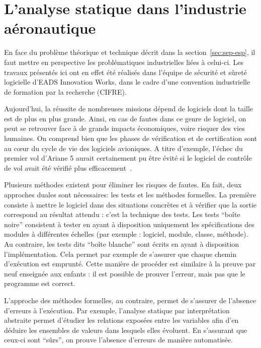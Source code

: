 \section{L'analyse statique dans l'industrie aéronautique}

En face du problème théorique et technique décrit dans la
section~\ref{sec:sep-esp}, il faut mettre en perspective les problématiques
industrielles liées à celui-ci. Les travaux présentés ici ont en effet été
réalisés dans l'équipe de sécurité et sûreté logicielle d'EADS Innovation Works,
dans le cadre d'une convention industrielle de formation par la recherche
(CIFRE).

Aujourd'hui, la réussite de nombreuses missions dépend de logiciels dont la
taille est de plus en plus grande. Ainsi, en cas de fautes dans ce genre de
logiciel, on peut se retrouver face à de grands impacts économiques, voire
risquer des vies humaines. On comprend bien que les phases de vérification et de
certification sont au cœur du cycle de vie des logiciels avioniques. A titre
d'exemple, l'échec du premier vol d'Ariane 5 aurait certainement pu être évité
si le logiciel de contrôle de vol avait été vérifié plus
efficacement~\cite{Ariane501}.

Plusieurs méthodes existent pour éliminer les risques de fautes. En fait, deux
approches duales sont nécessaires: les tests et les méthodes formelles. La
première consiste à mettre le logiciel dans des situations concrètes et à
vérifier que la sortie correspond au résultat attendu : c'est la technique des
tests.  Les tests \enquote{boîte noire} consistent à tester en ayant à
disposition uniquement les spécifications des modules à différentes échelles
(par exemple : logiciel, module, classe, méthode). Au contraire, les tests dits
\enquote{boîte blanche} sont écrits en ayant à disposition l'implémentation.
Cela permet par exemple de s'assurer que chaque chemin d'exécution est emprunté.
Cette manière de procéder est similaire à la preuve par neuf enseignée aux
enfants : il est possible de prouver l'erreur, mais pas que le programme est
correct.

L'approche des méthodes formelles, au contraire, permet de s'assurer de
l'absence d'erreurs à l'exécution. Par exemple, l'analyse statique par
interprétation abstraite permet d'étudier les relations exposées entre les
variables afin d'en déduire les ensembles de valeurs dans lesquels elles
évoluent. En s'assurant que ceux-ci sont \enquote{sûrs}, on prouve l'absence
d'erreurs de manière automatisée.

